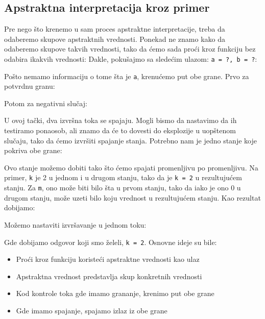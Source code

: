 \subsection{Apstraktna interpretacija kroz primer}
\label{subsec:absintex}
Pre nego što krenemo u sam proces apstraktne interpretacije, treba da odaberemo
skupove apstraktnih vrednosti. Ponekad ne znamo kako da odaberemo skupove takvih
vrednosti, tako da ćemo sada proći kroz funkciju bez odabira ikakvih vrednosti:
Dakle, pokušajmo sa sledećim ulazom: \texttt{a = ?, b = ?}:

Pošto nemamo informaciju o tome šta je \texttt{a}, krenućemo put obe grane.
Prvo za potvrdnu granu:

Potom za negativni slučaj:

U ovoj tački, dva izvršna toka se spajaju. Mogli bismo da nastavimo da ih testiramo
ponaosob, ali znamo da će to dovesti do eksplozije u uopštenom slučaju, tako da ćemo
izvršiti spajanje stanja. Potrebno nam je jedno stanje koje pokriva obe grane:

Ovo stanje možemo dobiti tako što ćemo spajati promenljivu po promenljivu. Na primer,
\texttt{k} je 2 u jednom i u drugom stanju, tako da je \texttt{k = 2} u rezultujućem
stanju. Za \texttt{m}, ono može biti bilo šta u prvom stanju, tako da iako je ono 0
u drugom stanju, može uzeti bilo koju vrednost u rezultujućem stanju. Kao rezultat dobijamo:

Možemo nastaviti izvršavanje u jednom toku:

Gde dobijamo odgovor koji smo želeli, \texttt{k = 2}. Osnovne ideje su bile:
\begin{itemize}
\item Proći kroz funkciju koristeći apstraktne vrednosti kao ulaz
\item Apstraktna vrednost predstavlja skup konkretnih vrednosti
\item Kod kontrole toka gde imamo grananje, krenimo put obe grane
\item Gde imamo spajanje, spajamo izlaz iz obe grane
\end{itemize}
\cite{MozWiki}

